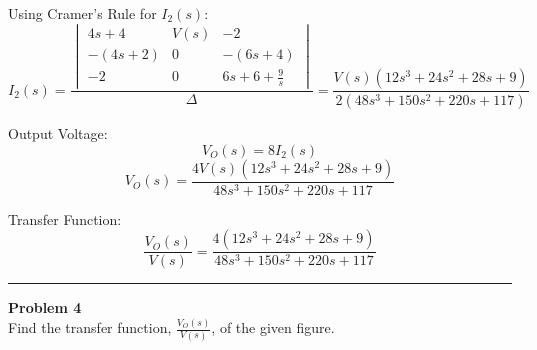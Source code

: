 \documentclass[11pt]{article}
\begin{document}
\bigskip

{Using Cramer's Rule for \(I_2(s)\):}
\[
I_2(s) = 
\frac{
\begin{vmatrix}
4s + 4 & V(s) & -2 \\
-(4s + 2) & 0 & -(6s + 4) \\
-2 & 0 & 6s + 6 + \frac{9}{s}
\end{vmatrix}
}
{\Delta}
= \frac{V(s)\left(12s^3 + 24s^2 + 28s + 9\right)}{2 \left(48s^3 + 150s^2 + 220s + 117\right)}
\]

\bigskip

{Output Voltage:}
\[
V_O(s) = 8 I_2(s)
\]
\[
V_O(s) = \frac{4V(s)\left(12s^3 + 24s^2 + 28s + 9\right)}{48s^3 + 150s^2 + 220s + 117}
\]

\bigskip

{Transfer Function:}
\[
\boxed{
\frac{V_O(s)}{V(s)} = \frac{4\left(12s^3 + 24s^2 + 28s + 9\right)}{48s^3 + 150s^2 + 220s + 117}
}
\]

\newpage
  \setcounter{page}{6}  
\noindent\rule{\textwidth}{1pt}
\noindent\textbf{Problem 4} \hfill 
\\ Find the transfer function, $\frac{V_O(s)}{V(s)}$, of the given figure.
\end{document}
